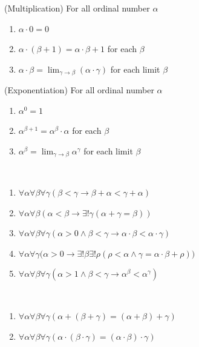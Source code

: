 \documentclass[12pt]{book}
\begin{document}
\begin{definition}(Multiplication)
	For all ordinal number $\alpha$
	\begin{enumerate}
		\item $\alpha\cdot 0=0$
		\item $\alpha\cdot(\beta+1)=\alpha\cdot\beta+1$ for each $\beta$
		\item $\alpha\cdot\beta=\lim_{\gamma\rightarrow\beta}(\alpha\cdot\gamma)$ for each limit $\beta$
	\end{enumerate}
\end{definition}

\begin{definition}(Exponentiation)
	For all ordinal number $\alpha$
	\begin{enumerate}
		\item $\alpha^0=1$
		\item $\alpha^{\beta+1}=\alpha^\beta\cdot \alpha$ for each $\beta$
		\item $\alpha^\beta=\lim_{\gamma\rightarrow\beta}\alpha^\gamma$ for each limit $\beta$
	\end{enumerate}
\end{definition}
\begin{lemma}
	\
	\begin{enumerate}
		\item $\forall\alpha\forall \beta\forall\gamma(\beta<\gamma\rightarrow\beta+\alpha<\gamma+\alpha )$
		\item $\forall\alpha\forall \beta(\alpha<\beta\rightarrow \exists !\gamma(\alpha+\gamma=\beta))$
		\item $\forall\alpha\forall \beta\forall\gamma(\alpha>0\wedge \beta<\gamma\rightarrow \alpha\cdot\beta<\alpha\cdot\gamma)$
		\item $\forall\alpha\forall\gamma(\alpha>0\rightarrow \exists !\beta\exists !$$\rho(\rho<\alpha\wedge \gamma=\alpha\cdot\beta+\rho))$
		\item $\forall\alpha\forall \beta\forall\gamma(\alpha>1\wedge \beta<\gamma\rightarrow \alpha^\beta<\alpha^\gamma)$
	\end{enumerate}
\end{lemma}
\begin{lemma}
	\
	\begin{enumerate}
		\item $\forall\alpha\forall \beta\forall\gamma(\alpha+(\beta+\gamma)=(\alpha+\beta)+\gamma)$ 
		\item $\forall\alpha\forall \beta\forall\gamma(\alpha\cdot(\beta\cdot\gamma)=(\alpha\cdot\beta)\cdot\gamma)$ 
	\end{enumerate}
\end{lemma}
\end{document}
